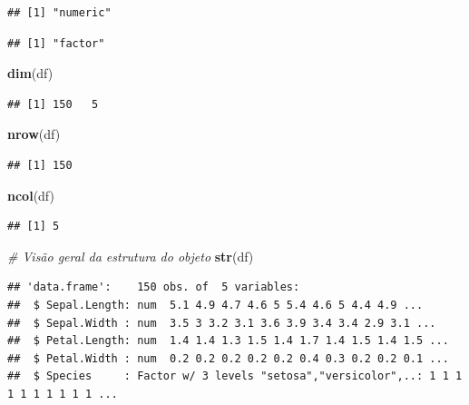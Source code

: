 \documentclass[
]{book}
\newenvironment{Shaded}{\begin{snugshade}}{\end{snugshade}}
\newcommand{\CommentTok}[1]{\textcolor[rgb]{0.56,0.35,0.01}{\textit{#1}}}
\newcommand{\FunctionTok}[1]{\textcolor[rgb]{0.13,0.29,0.53}{\textbf{#1}}}
\newcommand{\NormalTok}[1]{#1}
\newcommand{\SpecialCharTok}[1]{\textcolor[rgb]{0.81,0.36,0.00}{\textbf{#1}}}
\theoremstyle{definition}
\theoremstyle{definition}
\theoremstyle{definition}
\theoremstyle{definition}
\theoremstyle{remark}
\begin{document}
\begin{verbatim}
## [1] "numeric"
\end{verbatim}

\begin{Shaded}
\end{Shaded}

\begin{verbatim}
## [1] "factor"
\end{verbatim}

\begin{Shaded}
\begin{Highlighting}[]
\FunctionTok{dim}\NormalTok{(df)}
\end{Highlighting}
\end{Shaded}

\begin{verbatim}
## [1] 150   5
\end{verbatim}

\begin{Shaded}
\begin{Highlighting}[]
\FunctionTok{nrow}\NormalTok{(df)}
\end{Highlighting}
\end{Shaded}

\begin{verbatim}
## [1] 150
\end{verbatim}

\begin{Shaded}
\begin{Highlighting}[]
\FunctionTok{ncol}\NormalTok{(df)}
\end{Highlighting}
\end{Shaded}

\begin{verbatim}
## [1] 5
\end{verbatim}

\begin{Shaded}
\begin{Highlighting}[]
\CommentTok{\# Visão geral da estrutura do objeto}
\FunctionTok{str}\NormalTok{(df)}
\end{Highlighting}
\end{Shaded}

\begin{verbatim}
## 'data.frame':    150 obs. of  5 variables:
##  $ Sepal.Length: num  5.1 4.9 4.7 4.6 5 5.4 4.6 5 4.4 4.9 ...
##  $ Sepal.Width : num  3.5 3 3.2 3.1 3.6 3.9 3.4 3.4 2.9 3.1 ...
##  $ Petal.Length: num  1.4 1.4 1.3 1.5 1.4 1.7 1.4 1.5 1.4 1.5 ...
##  $ Petal.Width : num  0.2 0.2 0.2 0.2 0.2 0.4 0.3 0.2 0.2 0.1 ...
##  $ Species     : Factor w/ 3 levels "setosa","versicolor",..: 1 1 1 1 1 1 1 1 1 1 ...
\end{verbatim}
\end{document}
